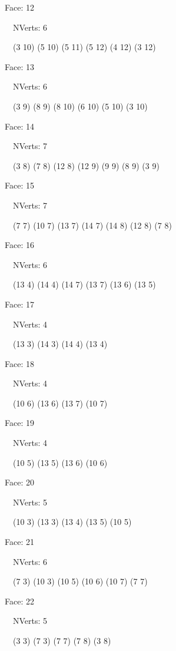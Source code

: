 \documentclass{article}
\begin{document}
{\footnotesize 

Face: 12

\   \    NVerts: 6

 \   \   (3 10) (5 10) (5 11) (5 12) (4 12) (3 12)}

{\footnotesize 

Face: 13

\   \    NVerts: 6

 \   \   (3 9) (8 9) (8 10) (6 10) (5 10) (3 10)}

{\footnotesize 

Face: 14

\   \    NVerts: 7

 \   \   (3 8) (7 8) (12 8) (12 9) (9 9) (8 9) (3 9)}

{\footnotesize 

Face: 15

\   \    NVerts: 7

 \   \   (7 7) (10 7) (13 7) (14 7) (14 8) (12 8) (7 8)}

{\footnotesize 

Face: 16

\   \    NVerts: 6

 \   \   (13 4) (14 4) (14 7) (13 7) (13 6) (13 5)}

{\footnotesize 

Face: 17

\   \    NVerts: 4

 \   \   (13 3) (14 3) (14 4) (13 4)}

{\footnotesize 

Face: 18

\   \    NVerts: 4

 \   \   (10 6) (13 6) (13 7) (10 7)}

{\footnotesize 

Face: 19

\   \    NVerts: 4

 \   \   (10 5) (13 5) (13 6) (10 6)}

{\footnotesize 

Face: 20

\   \    NVerts: 5

 \   \   (10 3) (13 3) (13 4) (13 5) (10 5)}

{\footnotesize 

Face: 21

\   \    NVerts: 6

 \   \   (7 3) (10 3) (10 5) (10 6) (10 7) (7 7)}

{\footnotesize 

Face: 22

\   \    NVerts: 5

 \   \   (3 3) (7 3) (7 7) (7 8) (3 8)}
\end{document}

